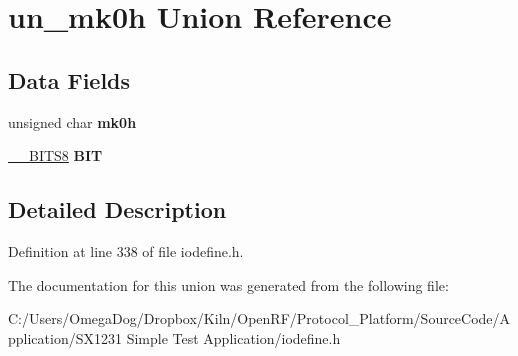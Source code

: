 \hypertarget{unionun__mk0h}{\section{un\-\_\-mk0h Union Reference}
\label{unionun__mk0h}
}
\subsection*{Data Fields}
\begin{DoxyCompactItemize}
\item 
\hypertarget{unionun__mk0h_a4854a95b10f83b84159a99fd5cdc63b8}{unsigned char {\bfseries mk0h}}\label{unionun__mk0h_a4854a95b10f83b84159a99fd5cdc63b8}

\item 
\hypertarget{unionun__mk0h_a3f7f7e7b6da490239d0e5058213a4cca}{\hyperlink{struct_____b_i_t_s8}{\-\_\-\-\_\-\-B\-I\-T\-S8} {\bfseries B\-I\-T}}\label{unionun__mk0h_a3f7f7e7b6da490239d0e5058213a4cca}

\end{DoxyCompactItemize}


\subsection{Detailed Description}


Definition at line 338 of file iodefine.\-h.



The documentation for this union was generated from the following file\-:\begin{DoxyCompactItemize}
\item 
C\-:/\-Users/\-Omega\-Dog/\-Dropbox/\-Kiln/\-Open\-R\-F/\-Protocol\-\_\-\-Platform/\-Source\-Code/\-Application/\-S\-X1231 Simple Test Application/iodefine.\-h\end{DoxyCompactItemize}
